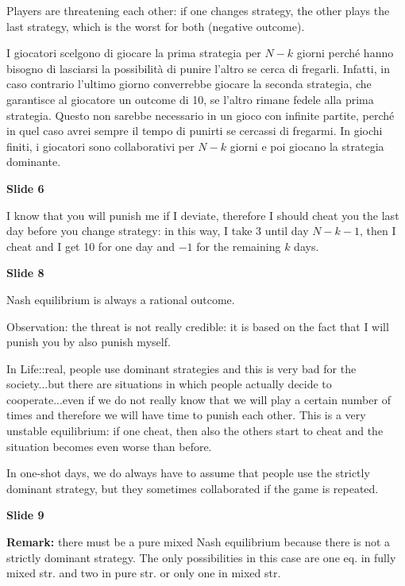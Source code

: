 \noindent Players are threatening each other: if one changes strategy, the other 
plays the last strategy, which is the worst for both (negative outcome).

\noindent I giocatori scelgono di giocare la prima strategia per $N-k$ giorni 
perché hanno bisogno di lasciarsi la possibilità di punire l'altro se cerca di 
fregarli. Infatti, in caso contrario l'ultimo giorno converrebbe giocare la 
seconda strategia, che garantisce al giocatore un outcome di 10, se l'altro 
rimane fedele alla prima strategia. Questo non sarebbe necessario in un gioco 
con infinite partite, perché in quel caso avrei sempre il tempo di punirti se 
cercassi di fregarmi. In giochi finiti, i giocatori sono collaborativi per 
$N-k$ giorni e poi giocano la strategia dominante.

\bigskip
\noindent \textbf{Slide 6}

\noindent I know that you will punish me if I deviate, therefore I should 
cheat you the last day before you change strategy: in this way, I take 3 
until day $N-k-1$, then I cheat and I get 10 for one day and $-1$ for the 
remaining $k$ days.

\bigskip
\noindent \textbf{Slide 8}

\noindent Nash equilibrium is always a rational outcome.

\noindent Observation: the threat is not really credible: %
it is based on the fact that I will punish you by also punish myself.

\noindent In Life::real, people use dominant strategies and this is very bad 
for the society...but there are situations in which people actually decide to 
cooperate...even if we do not really know that we will play a certain 
number of times and therefore we will have time to punish each other. This is 
a very unstable equilibrium: if one cheat, then also the others start to cheat 
and the situation becomes even worse than before.

\noindent In one-shot days, we do always have to assume that people use the 
strictly dominant strategy, but they sometimes collaborated if the game is 
repeated.

\bigskip
\noindent \textbf{Slide 9}

\noindent \textbf{Remark:} there must be a pure mixed Nash equilibrium because 
there is not a strictly dominant strategy. The only possibilities in this case 
are one eq. in fully mixed str. and two in pure str. or only one in mixed str.


